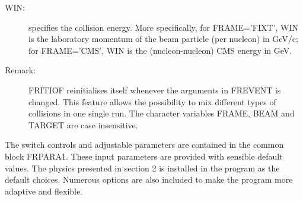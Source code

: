 \begin{itemize}
\begin{description}
\item[WIN:] specifies the collision energy.  More specifically,
     for FRAME='FIXT', WIN is the laboratory momentum of the beam particle 
         (per nucleon) in GeV/c;  
     for FRAME='CMS', WIN is the (nucleon-nucleon) CMS energy in GeV.

\item[Remark:] FRITIOF reinitialises itself whenever the arguments
      in FREVENT is changed.  This feature allows the possibility to mix 
      different types of collisions in one single run.    
      The character variables FRAME, BEAM and TARGET are case insensitive.  

\end{description}
\end{itemize}

The switch controls and adjustable parameters are contained in the common
block FRPARA1.  These input parameters are provided with sensible default
values.  The physics presented in section 2 is installed 
in the program as the default choices.  Numerous options are also 
included to make the program more adaptive and flexible.

